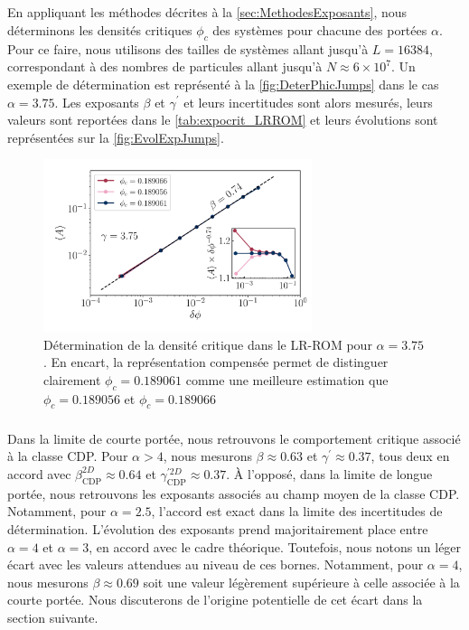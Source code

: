 \subparagraph{}En appliquant les méthodes décrites à la \autoref{sec:MethodesExposants}, nous déterminons les densités critiques $\phi_c$ des systèmes pour chacune des portées $\alpha$. Pour ce faire, nous utilisons des tailles de systèmes allant jusqu'à $L=16384$, correspondant à des nombres de particules allant jusqu'à $N\approx 6\times 10^7$. Un exemple de détermination est représenté à la \autoref{fig:DeterPhicJumps} dans le cas $\alpha = 3.75$. Les exposants $\beta$ et $\gamma^\prime$ et leurs incertitudes sont alors mesurés, leurs valeurs sont reportées dans le \autoref{tab:expocrit_LRROM} et leurs évolutions sont représentées sur la \autoref{fig:EvolExpJumps}.

\begin{figure}[h]
	\centering
	\includegraphics[width=0.7\textwidth]{Chapitre2/Figures/Exposants/Deter_phic_gamma375_LRROM.pdf}
	\caption{Détermination de la densité critique dans le LR-ROM pour $\alpha=3.75$. En encart, la représentation compensée permet de distinguer clairement $\phi_c = 0.189061$ comme une meilleure estimation que $\phi_c = 0.189056$ et $\phi_c = 0.189066$}
	\label{fig:DeterPhicJumps}
\end{figure}

\subparagraph{}Dans la limite de courte portée, nous retrouvons le comportement critique associé à la classe CDP. Pour $\alpha > 4$, nous mesurons $\beta\approx 0.63$ et $\gamma^\prime \approx 0.37$, tous deux en accord avec $\beta_\text{CDP}^{2D}\approx 0.64$ et $\gamma_\text{CDP}^{\prime 2D}\approx 0.37$. \`A l'opposé, dans la limite de longue portée, nous retrouvons les exposants associés au champ moyen de la classe CDP. Notamment, pour $\alpha = 2.5$, l'accord est exact dans la limite des incertitudes de détermination. L'évolution des exposants prend majoritairement place entre $\alpha = 4$ et $\alpha = 3$, en accord avec le cadre théorique. Toutefois, nous notons un léger écart avec les valeurs attendues au niveau de ces bornes. Notamment, pour $\alpha = 4$, nous mesurons $\beta \approx 0.69$ soit une valeur légèrement supérieure à celle associée à la courte portée. Nous discuterons de l'origine potentielle de cet écart dans la section suivante.

